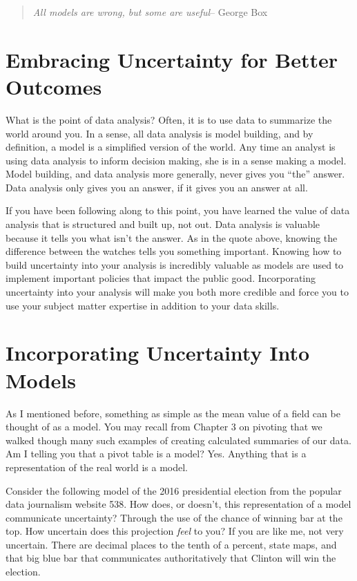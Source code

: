 \documentclass[
]{book}
\begin{document}
\begin{quote}
\emph{All models are wrong, but some are useful}-- George Box
\end{quote}

\hypertarget{embracing-uncertainty-for-better-outcomes}{%
\section{Embracing Uncertainty for Better Outcomes}\label{embracing-uncertainty-for-better-outcomes}}

What is the point of data analysis? Often, it is to use data to summarize the world around you. In a sense, all data analysis is model building, and by definition, a model is a simplified version of the world. Any time an analyst is using data analysis to inform decision making, she is in a sense making a model. Model building, and data analysis more generally, never gives you ``the'' answer. Data analysis only gives you an answer, if it gives you an answer at all.

If you have been following along to this point, you have learned the value of data analysis that is structured and built up, not out. Data analysis is valuable because it tells you what isn't the answer. As in the quote above, knowing the difference between the watches tells you something important. Knowing how to build uncertainty into your analysis is incredibly valuable as models are used to implement important policies that impact the public good. Incorporating uncertainty into your analysis will make you both more credible and force you to use your subject matter expertise in addition to your data skills.

\hypertarget{incorporating-uncertainty-into-models}{%
\section{Incorporating Uncertainty Into Models}\label{incorporating-uncertainty-into-models}}

As I mentioned before, something as simple as the mean value of a field can be thought of as a model. You may recall from Chapter 3 on pivoting that we walked though many such examples of creating calculated summaries of our data. Am I telling you that a pivot table is a model? Yes. Anything that is a representation of the real world is a model.

Consider the following model of the 2016 presidential election from the popular data journalism website 538. How does, or doesn't, this representation of a model communicate uncertainty? Through the use of the chance of winning bar at the top. How uncertain does this projection \emph{feel} to you? If you are like me, not very uncertain. There are decimal places to the tenth of a percent, state maps, and that big blue bar that communicates authoritatively that Clinton will win the election.
\end{document}
